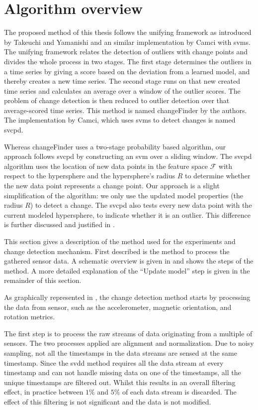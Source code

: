 \section{Algorithm overview}\label{sec:method_overview}
The proposed method of this thesis follows the unifying framework as introduced by Takeuchi and Yamanishi \cite{takeuchi2006unifying} and an similar implementation by Camci \cite{camci2010change} with \glspl{svm}.
The unifying framework relates the detection of outliers with change points and divides the whole process in two stages.
The first stage determines the outliers in a time series by giving a score based on the deviation from a learned model, and thereby creates a new time series.
The second stage runs on that new created time series and calculates an average over a window of the outlier scores.
The problem of change detection is then reduced to outlier detection over that average-scored time series.
This method is named \gls{changeFinder} by the authors.
The implementation by Camci, which uses \glspl{svm} to detect changes is named \acrlong{svcpd}.

Whereas \gls{changeFinder} uses a two-stage probability based algorithm, our approach follows \gls{svcpd} by constructing an \gls{svm} over a sliding window.
The \gls{svcpd} algorithm uses the location of new data points in the feature space $\mathcal{F}$ with respect to the hypersphere and the hypersphere's radius $R$ to determine whether the new data point represents a change point.
Our approach is a slight simplification of the algorithm: we only use the updated model properties (\ie the radius $R$) to detect a change.
The \gls{svcpd} also tests every new data point with the current modeled hypersphere, to indicate whether it is an outlier.
This difference is further discussed and justified in .

This section gives a description of the method used for the experiments and change detection mechanism.
First described is the method to process the gathered sensor data.
A schematic overview is given in  and shows the steps of the method.
A more detailed explanation of the ``Update model'' step is given in the remainder of this section.

As graphically represented in , the change detection method starts by processing the data from sensor, such as the accelerometer, magnetic orientation, and rotation metrics.

The first step is to process the raw streams of data originating from a multiple of sensors.
The two processes applied are alignment and normalization.
Due to noisy sampling, not all the timestamps in the data streams are sensed at the same timestamp.
Since the \gls{svdd} method requires all the data stream at every timestamp and can not handle missing data on one of the timestamps, all the unique timestamps are filtered out.
Whilst this results in an overall filtering effect, in practice between $1\%$ and $5\%$ of each data stream is discarded.
The effect of this filtering is not significant and the data is not modified.

